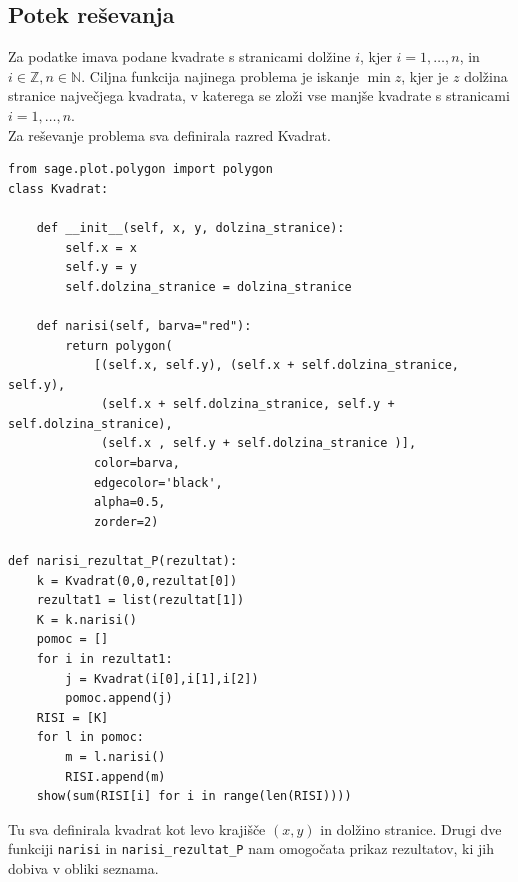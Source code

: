 \documentclass[a4paper, 11pt]{article}
\newcommand{\N}{\mathbb N}
\newcommand{\Z}{\mathbb Z}
\begin{document}
\subsection{Potek reševanja}
Za podatke imava podane kvadrate s stranicami dolžine $i$, kjer $i = 1, \dots , n$, in $ i \in \Z, n \in \N$.
Ciljna funkcija najinega problema je iskanje $\min z$, kjer je $z$ dolžina stranice največjega kvadrata, v katerega
se zloži vse manjše kvadrate s stranicami $i = 1, \dots , n$.\\
Za reševanje problema sva definirala razred Kvadrat.
\begin{verbatim}
from sage.plot.polygon import polygon
class Kvadrat:

    def __init__(self, x, y, dolzina_stranice):
        self.x = x
        self.y = y
        self.dolzina_stranice = dolzina_stranice

    def narisi(self, barva="red"):
        return polygon(
            [(self.x, self.y), (self.x + self.dolzina_stranice, self.y),
             (self.x + self.dolzina_stranice, self.y + self.dolzina_stranice),
             (self.x , self.y + self.dolzina_stranice )],
            color=barva,
            edgecolor='black',
            alpha=0.5,
            zorder=2)

def narisi_rezultat_P(rezultat):
    k = Kvadrat(0,0,rezultat[0])
    rezultat1 = list(rezultat[1])
    K = k.narisi()
    pomoc = []
    for i in rezultat1:
        j = Kvadrat(i[0],i[1],i[2])
        pomoc.append(j)
    RISI = [K]
    for l in pomoc:
        m = l.narisi()
        RISI.append(m)
    show(sum(RISI[i] for i in range(len(RISI))))
\end{verbatim}
Tu sva definirala kvadrat kot levo krajišče $(x,y)$ in dolžino stranice. Drugi dve funkciji
\texttt{narisi} in \verb|narisi_rezultat_P| nam omogočata prikaz rezultatov, ki jih dobiva v obliki seznama.
\end{document}
